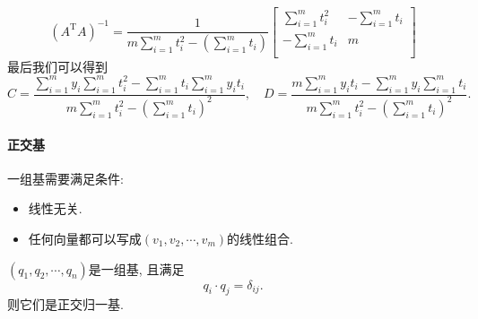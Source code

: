 \begin{equation}
  \left( A^{\mathrm{T}}A \right) ^{-1}
  =
  \frac{1}{m \sum_{i=1}^{m} t_i^{2} - \left( \sum_{i=1}^{m} t_i \right) } \begin{bmatrix}
   \sum_{i=1}^{m} t_i^{2} & -\sum_{i=1}^{m} t_i\\
   -\sum_{i=1}^{m} t_i & m\\
  \end{bmatrix}
\end{equation}
最后我们可以得到
\begin{equation}
  C = \frac{\sum_{i=1}^{m} y_i \sum_{i=1}^{m} t_i^{2} - \sum_{i=1}^{m} t_i \sum_{i=1}^{m} y_i t_i}{m \sum_{i=1}^{m} t_i^{2} - \left( \sum_{i=1}^{m} t_i \right) ^{2}}
  ,\quad
  D = \frac{m\sum_{i=1}^{m} y_i t_i - \sum_{i=1}^{m} y_i \sum_{i=1}^{m} t_i}{m \sum_{i=1}^{m} t_i^{2} - \left( \sum_{i=1}^{m} t_i \right) ^{2}}.
\end{equation}

\paragraph{正交基}
一组基需要满足条件:
\begin{itemize}
    \item 线性无关.
    \item 任何向量都可以写成$\left( v_1,v_2,\cdots,v_m \right) $的线性组合.
\end{itemize}

\begin{definition}
    $\left( q_1,q_2,\cdots,q_n \right) $是一组基, 且满足
    \begin{equation}
      q_i \cdot q_j = \delta_{ij}.
    \end{equation}
    则它们是正交归一基.
\end{definition}

